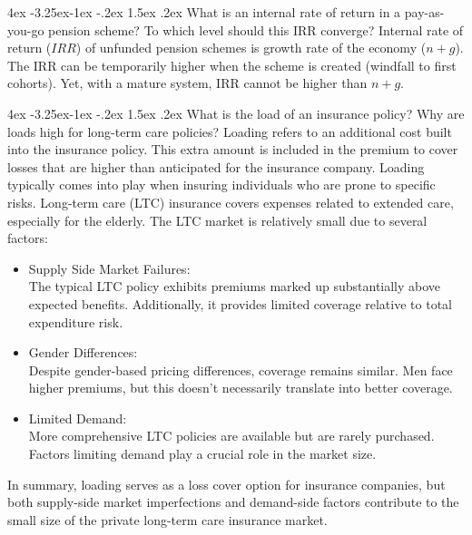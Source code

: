 \documentclass[11pt]{report}
\makeatletter
\newcommand{\bb}{\bigbreak\noindent}
\renewcommand\subsection{\leftskip 4ex\@startsection{subsection}{2}{\z@}%
	{-3.25ex\@plus -1ex \@minus -.2ex}%
	{1.5ex \@plus .2ex}%
	{\normalfont\large\bfseries}}
\makeatother
\begin{document}
\begin{spacing}{1.5}
	\subsection{What is an internal rate of return in a pay-as-you-go pension scheme? To which level should this IRR converge?}
	Internal rate of return ($IRR$) of unfunded pension schemes is growth rate of the economy ($n + g $). The IRR can be temporarily higher when the scheme is created (windfall to first cohorts). Yet, with a mature system, IRR cannot be higher than $n + g$.
	
	\subsection{What is the load of an insurance policy? Why are loads high for long-term care policies?}
	Loading refers to an additional cost built into the insurance policy. This extra amount is included in the premium to cover losses that are higher than anticipated for the insurance company. Loading typically comes into play when insuring individuals who are prone to specific risks. 
	\bb
	Long-term care (LTC) insurance covers expenses related to extended care, especially for the elderly.
	The LTC market is relatively small due to several factors:
	\begin{itemize}[leftmargin=10ex]
		\item Supply Side Market Failures:\\
		 The typical LTC policy exhibits premiums marked up substantially above expected benefits. Additionally, it provides limited coverage relative to total expenditure risk.
		\item Gender Differences:\\
		 Despite gender-based pricing differences, coverage remains similar. Men face higher premiums, but this doesn't necessarily translate into better coverage.
		\item Limited Demand: \\
		More comprehensive LTC policies are available but are rarely purchased. Factors limiting demand play a crucial role in the market size.
		
	\end{itemize}
	In summary, loading serves as a loss cover option for insurance companies, but both supply-side market imperfections and demand-side factors contribute to the small size of the private long-term care insurance market. 
	
	

\end{spacing}
\end{document}
